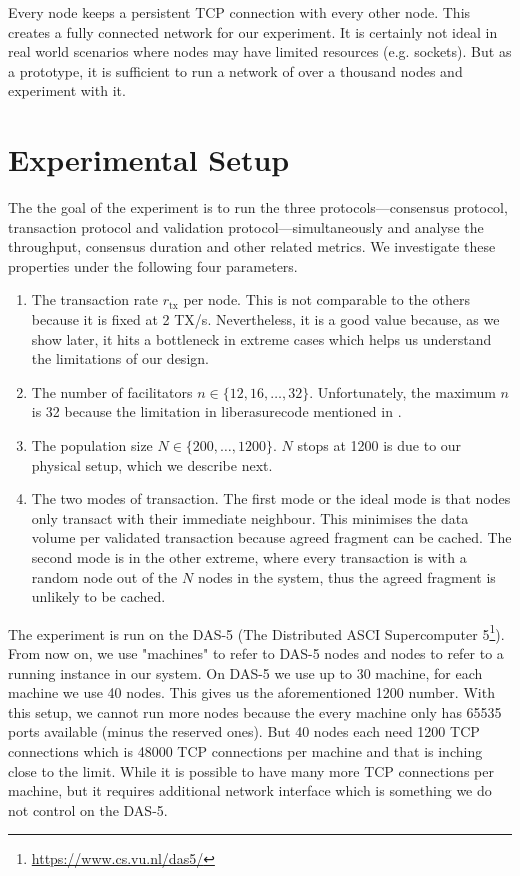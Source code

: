 Every node keeps a persistent TCP connection with every other node.
This creates a fully connected network for our experiment.
It is certainly not ideal in real world scenarios where nodes may have limited resources (e.g. sockets).
But as a prototype, it is sufficient to run a network of over a thousand nodes and experiment with it.

\section{Experimental Setup}
\label{sec:experimental-setup}

The the goal of the experiment is to run the three protocols---consensus protocol,
transaction protocol and validation protocol---simultaneously and analyse the throughput, consensus duration and other related metrics.
We investigate these properties under the following four parameters.
\begin{enumerate}
  \item The transaction rate $r_{\text{tx}}$ per node. This is not comparable to the others because it is fixed at 2 TX/s.
        Nevertheless, it is a good value because, as we show later,
        it hits a bottleneck in extreme cases which helps us understand the limitations of our design.
  \item The number of facilitators $n \in \{ 12, 16, \dots, 32\}$.
        Unfortunately, the maximum $n$ is 32 because the limitation in liberasurecode mentioned in .
  \item The population size $N \in \{200, \dots, 1200\}$.
        $N$ stops at 1200 is due to our physical setup, which we describe next.
  \item The two modes of transaction.
        The first mode or the ideal mode is that nodes only transact with their immediate neighbour. 
        This minimises the data volume per validated transaction because agreed fragment can be cached.
        The second mode is in the other extreme, where every transaction is with a random node out of the $N$ nodes in the system,
        thus the agreed fragment is unlikely to be cached.
\end{enumerate}

The experiment is run on the DAS-5 (The Distributed ASCI Supercomputer 5\footnote{\url{https://www.cs.vu.nl/das5/}}).
From now on, we use "machines" to refer to DAS-5 nodes and nodes to refer to a running instance in our system.
On DAS-5 we use up to 30 machine, for each machine we use 40 nodes.
This gives us the aforementioned 1200 number.
With this setup, we cannot run more nodes because the every machine only has 65535 ports available (minus the reserved ones).
But 40 nodes each need 1200 TCP connections which is 48000 TCP connections per machine and that is inching close to the limit.
While it is possible to have many more TCP connections per machine,
but it requires additional network interface which is something we do not control on the DAS-5.

